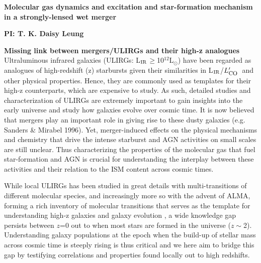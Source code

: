 \documentclass[12pt,a4paper]{article}  %
\newcommand{\Lsun}{\mbox{L$_{\odot}$}\xspace}
\newcommand{\LIR}{\mbox{L$_{\rm IR}$}\xspace}
\newcommand{\Lp}[1][CO]{\mbox{$L^{\prime}_\textrm{\fontsize{8pt}{12pt}\selectfont{#1}}$}}
\begin{document}
\pagestyle{plain}
 
\begin{center}
{\large{\bf
{ 
Molecular gas dynamics and excitation and star-formation mechanism in a
strongly-lensed wet merger}
}}
\end{center}
\vspace{-0.545em}
\centerline{\normalsize{\bf PI: 
{T. K. Daisy Leung}}} 
\vspace{0.1em} {\bf Missing link between mergers/ULIRGs and their high-z analogues} 
Ultraluminous infrared galaxies (ULIRGs: \LIR$\geq$10$^{12}$\Lsun) have been
regarded as 
analogues of high-redshift (z) starbursts given their
similarities in \LIR/\Lp\ and other physical properties. Hence, 
they are commonly used as templates for 
their high-z counterparts, which are expensive to study.
As such, detailed studies and characterization of ULIRGs are extremely important 
to gain insights into the early universe and study how galaxies evolve over cosmic time.
It is now believed that mergers play an important role in giving rise to these dusty galaxies
(e.g. Sanders \& Mirabel 1996). Yet, merger-induced effects on the physical mechanisms and chemistry 
that drive the intense starburst and AGN activities on small scales are still unclear.
Thus characterizing the properties of the molecular gas that fuel star-formation and AGN is
crucial for understanding the interplay between these activities 
and their relation to the ISM content across cosmic times.

While local ULIRGs 
has been studied
in great details with multi-transitions of different molecular species, 
and increasingly more so with the advent of ALMA,
forming a rich inventory of molecular transitions that serves as the template for 
understanding high-z galaxies and galaxy evolution \citep[e.g.][]{Rangwala15a}, a wide knowledge gap persists
between $z$=0 out to when most stars are formed in the universe ($z\sim$2). 
Understanding galaxy populations at the epoch when the build-up of stellar mass across cosmic
time is steeply rising is thus critical and we here aim to bridge this gap by testifying
correlations and properties found locally out to high redshifts. 
\end{document}

